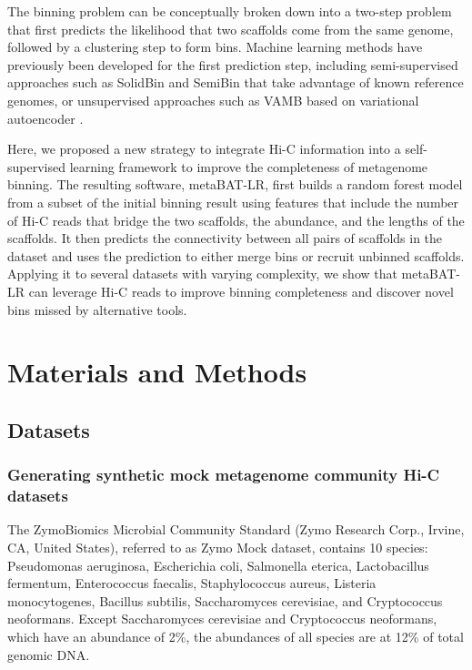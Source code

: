 \documentclass[fleqn,10pt,lineno]{wlpeerj}
\begin{document}
The binning problem can be conceptually broken down into a two-step problem that first predicts the likelihood that two scaffolds come from the same genome, followed by a clustering step to form bins. Machine learning methods have previously been developed for the first prediction step, including semi-supervised approaches such as SolidBin \citep{wang2019solidbin} and SemiBin \citep{pan2022deep} that take advantage of known reference genomes, or unsupervised approaches such as VAMB based on variational autoencoder \citep{nissen2021improved}. 

Here, we proposed a new strategy to integrate Hi-C information into a self-supervised learning framework to improve the completeness of metagenome binning. The resulting software, metaBAT-LR, first builds a random forest model from a subset of the initial binning result using features that include the number of Hi-C reads that bridge the two scaffolds, the abundance, and the lengths of the scaffolds. It then predicts the connectivity between all pairs of scaffolds in the dataset and uses the prediction to either merge bins or recruit unbinned scaffolds. Applying it to several datasets with varying complexity, we show that metaBAT-LR can leverage Hi-C reads to improve binning completeness and discover novel bins missed by alternative tools.  

\section*{Materials and Methods}

\subsection*{Datasets}

\subsubsection*{Generating synthetic mock metagenome community Hi-C datasets}

The ZymoBiomics Microbial Community Standard (Zymo Research Corp., Irvine, CA, United States), referred to as Zymo Mock dataset, contains 10 species: Pseudomonas aeruginosa, Escherichia coli, Salmonella eterica, Lactobacillus fermentum, Enterococcus faecalis, Staphylococcus aureus, Listeria monocytogenes, Bacillus subtilis, Saccharomyces cerevisiae, and Cryptococcus neoformans. Except Saccharomyces cerevisiae and Cryptococcus neoformans, which have an abundance of 2\%, the abundances of all species are at 12\% of total genomic DNA.
\end{document}
